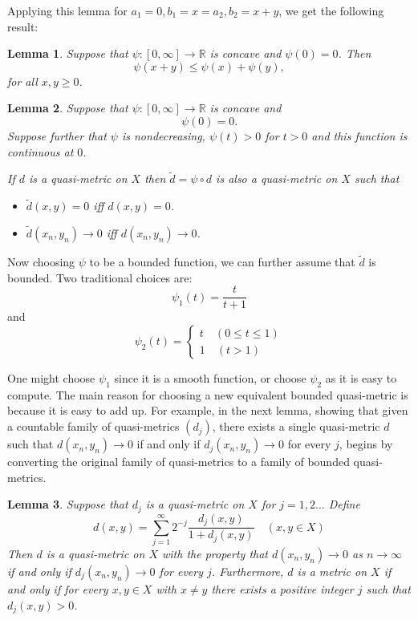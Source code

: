\documentclass[12pt]{article} %
\newtheorem{lemma}{Lemma}
\begin{document}
Applying this lemma for $a_1 =0, b_1=x = a_2, b_2=x+y$, we get the following result:
\begin{lemma}
  Suppose that $\psi \colon [0,\infty] \to \mathbb{R}$ is concave and $\psi(0)=0$. Then
  \[ \psi(x+y) \le \psi(x) + \psi(y),\]
  for all $x,y \ge 0$.
\end{lemma}
\begin{lemma}
  Suppose that $\psi \colon [0,\infty] \to \mathbb{R}$ is concave and
  \[\psi(0)=0.\]
  Suppose further that $\psi$ is nondecreasing, $\psi(t) >0$ for $t >0$ and this function is continuous at $0$.

  If $d$ is a quasi-metric on $X$ then $\tilde{d} = \psi \circ d$ is also a quasi-metric on $X$
  such that
  \begin{itemize}
    \item $\tilde{d}(x,y)=0$ iff $d(x,y)=0$.
    \item $\tilde{d}(x_n,y_n) \to 0$ iff $d(x_n,y_n) \to 0$.
  \end{itemize}
\end{lemma}
Now choosing $\psi$ to be a bounded function, we can further assume that $\tilde{d}$ is bounded. Two traditional choices are:
\[ \psi_1(t)= \dfrac{t}{t+1}\]
and
\[\psi_2(t) = \begin{cases}
    t \quad (0 \le t \le 1) \\
    1 \quad (t >1)
  \end{cases}\]

One might choose $\psi_1$ since it is a smooth function, or choose $\psi_2$ as it is easy to compute.
The main reason for choosing a new equivalent bounded quasi-metric is because it is easy to add up.
For example, in the next lemma, showing that given a countable family of quasi-metrics $(d_j)$, there exists a single quasi-metric $d$
such that $d(x_n,y_n) \to 0$  if and only if $d_j(x_n,y_n) \to 0$ for every $j$, begins by converting the original family of quasi-metrics to a family of bounded quasi-metrics.

\begin{lemma}
  Suppose that $d_j$ is a quasi-metric on $X$ for $j =1,2\ldots$ Define
  \[d(x,y) = \sum_{j=1}^\infty 2^{-j}\dfrac{d_j(x,y)}{1+d_j(x,y)} \quad (x,y \in X)\]
  Then $d$ is a quasi-metric on $X$ with the property that $d(x_n,y_n) \to 0$ as $n \to \infty$
  if and only if $d_j(x_n,y_n) \to 0$ for every $j$.
  Furthermore, $d$ is a metric on $X$ if and only if for every $x,y \in X$ with $x \ne y$ there exists a positive integer $j$ such that $d_j(x,y)>0$.
\end{lemma}
\end{document}
